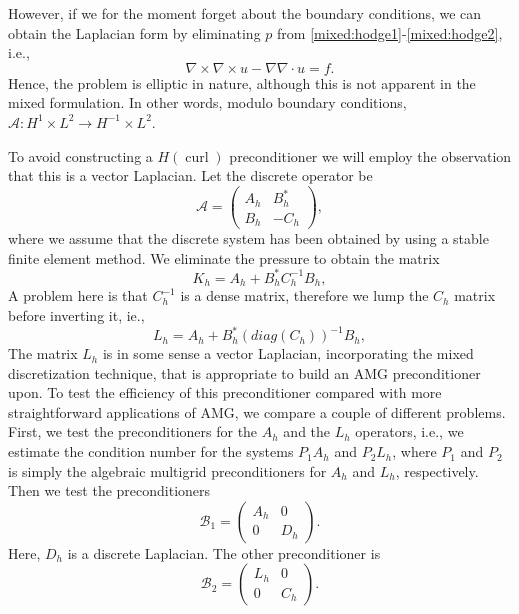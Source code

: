 However, if we for the moment forget about the boundary conditions, 
we can obtain the Laplacian form  by eliminating $p$ 
from \eqref{mixed:hodge1}-\eqref{mixed:hodge2}, i.e.,    
\[
\nabla \times \nabla \times u - \nabla \nabla \cdot u = f .  
\]
Hence, the problem is elliptic
in nature, although this is not apparent in the mixed formulation. 
In other words, modulo boundary conditions,  $\mathcal{A}: H^1 \times L^2 \rightarrow  H^{-1} \times L^2$.

To avoid constructing a $H(\operatorname{curl})$ preconditioner we will employ
the observation that this is a vector Laplacian. 
Let the discrete operator be 
\[
\mathcal{A}  =
\begin{pmatrix} A_h & B_h^* \\ B_h & -C_h \end{pmatrix}, 
\]
where we assume that the discrete system has been obtained by using a stable finite
element method. We eliminate the pressure to obtain the matrix 
\[
K_h  = A_h +  B_h^* C^{-1}_h B_h, 
\]
A problem here is that $C^{-1}_h$ is a dense matrix, therefore we lump the $C_h$ matrix before inverting it, ie.,   
\[
L_h  = A_h +  B_h^* (diag(C_h))^{-1} B_h, 
\]
The matrix $L_h$ is in some sense a vector Laplacian, incorporating the mixed discretization technique, that is appropriate to build an AMG preconditioner upon. 
To test the efficiency of this preconditioner compared with 
more straightforward applications of AMG, we compare a couple of different problems.   
First, we test the preconditioners for the $A_h$ and the $L_h$ operators, 
i.e., we estimate the condition number for the systems 
$P_1 A_h$ and $P_2 L_h$, where $P_1$ and $P_2$ is simply the algebraic multigrid 
preconditioners for $A_h$ and $L_h$, respectively. 
Then we test the preconditioners 
\[
\mathcal{B}_1  =
\begin{pmatrix} A_h & 0  \\ 0  & D_h \end{pmatrix}. 
\]
Here, $D_h$ is a discrete Laplacian. The other preconditioner is   
\[
\mathcal{B}_2  =
\begin{pmatrix} L_h & 0  \\ 0  & C_h \end{pmatrix}. 
\]

